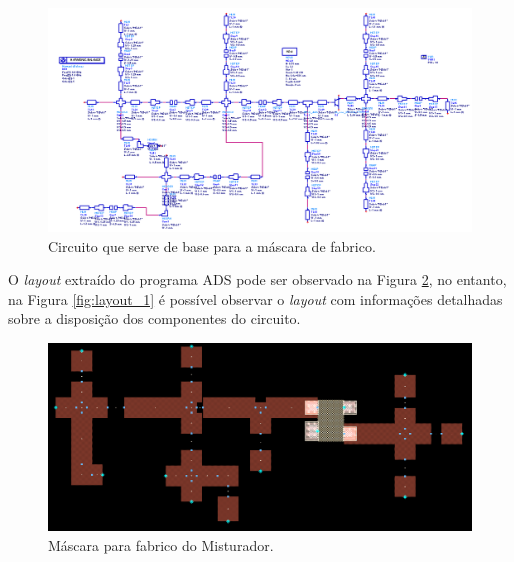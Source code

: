 \documentclass[11pt]{article}
\numberwithin{equation}{section}
\begin{document}
\begin{figure}[H]
	\centering
	\includegraphics[keepaspectratio=true, scale=0.45]{exps/Circuito_5}
	\vspace{-0.5em}
	\caption{Circuito que serve de base para a máscara de fabrico.}
	\vspace{-0.8em}
	\label{fig:Circuito_5}
\end{figure}

O \textit{layout} extraído do programa ADS pode ser observado na Figura \ref{fig:layout_0}, no entanto, na Figura \ref{fig:layout_1} é possível observar o \textit{layout} com informações detalhadas sobre a disposição dos componentes do circuito.

\begin{figure}[H]
	\centering
	\includegraphics[keepaspectratio=true, scale=0.45]{exps/layout_0}
	\vspace{-0.5em}
	\caption{Máscara para fabrico do Misturador.}
	\vspace{-0.8em}
	\label{fig:layout_0}
\end{figure}
\end{document}
